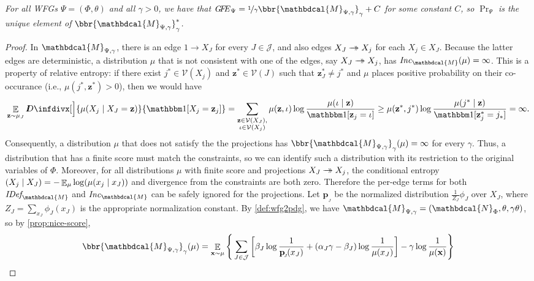 \documentclass[letterpaper]{article} %
\makeatletter
\theoremstyle{plain}
\theoremstyle{definition}
\theoremstyle{remark}
\newcommand{\restate}[2]
	{\medskip\par\noindent{\bf \expandarg\Cref{thmt@@#1}.}%
 	\noindent\begingroup\em #2 \endgroup\par\smallskip}
\let\H\relax
\DeclareMathOperator{\H}{\mathrm{H}} %
\DeclareMathOperator*{\Ex}{\mathbb{E}} %
\newcommand\mat[1]{\mathbf{#1}}
\newcommand{\thickD}{I\mkern-8muD}
\newcommand{\kldiv}{\thickD\infdivx}
\newcommand{\tto}{\rightarrow\mathrel{\mspace{-15mu}}\rightarrow}
\newcommand{\bp}[1][L]{\mat{p}_{\!_{#1}\!}}
\newcommand{\V}{\mathcal V}
\newcommand{\dg}[1]{\mathbdcal{#1}}
\newcommand{\IDef}[1]{\mathit{IDef}_{\!#1}}
\newcommand\Inc{\mathit{Inc}}
\newcommand{\PDGof}[1]{{\dg M}_{#1}}
\newcommand{\UPDGof}[1]{{\dg N}_{#1}}
\newcommand\GFE{\mathit{G\mkern-4mu F\mkern-4.5mu E}}
\makeatother
\begin{document}
\restate{thm:fg-is-pdg}{
	For all WFGs $\Psi = (\Phi,\theta)$ and all $\gamma > 0$,
	we have that
	$\GFE_\Psi
	= \nicefrac1{\gamma} \bbr{{\dg M}_{\Psi,\gamma}}_{\gamma} 
	+ C$   
	for some constant $C$, so
	$\Pr_{\Psi}$ is the unique element of
	$\bbr{{\dg M}_{\Psi,\gamma}}_{\gamma}^*$.
}
\begin{proof}
  In $\PDGof{\Psi,\gamma}$,  there is an edge $1 \to X_J$ for every $J
  \in \mathcal J$, and also edges 
  $X_J \tto X_j$ for each $X_j
    \in X_J$. Because the latter edges are deterministic, a
distribution $\mu$ that is not  consistent
with one of the edges, say $X_J \tto X_j$, has $\Inc_{\dg M}(\mu)
= \infty$.  This is a 
property of relative entropy: if there exist $j^* \in \V(X_j)$ and 
$\mat z^* \in \V(J)$ such that $\mat z^*_J \ne j^*$ and $\mu$ places positive
probability on their co-occurance (i.e., $\mu(j^*, \mat z^*) > 0$),
then we would have
\[ \Ex_{\mat z \sim \mu_{J}}\kldiv[\Big]{\mu(X_j \mid X_J = \mat z)}
	{\mathbbm1[X_j = \mat z_{j}]}
 	= \sum_{\substack{\mat z \in \V(X_J),\\ \iota \in \V(X_j)}} \mu(\mat z, \iota) \log \frac{\mu(\iota \mid \mat z)}{\mathbbm1[\mat z_j = \iota]}
	\geq \mu(\mat z^*, j^*) \log \frac{\mu(j^* \mid \mat z)}{\mathbbm1[\mat z^*_j = j_*]}
	= \infty. \]
Consequently, a distribution $\mu$ that does not satisfy the the projections has
$\bbr{\dg M_{\Psi,\gamma}}_\gamma(\mu) = \infty$ for every $\gamma$.
          Thus, a distribution that 
        has a finite score must match the constraints,
so we can identify such a distribution with its restriction to 
the original  
variables of $\Phi$.
Moreover, for all distributions $\mu$ with finite score and
projections $X_J \tto 
X_j$, the conditional entropy 
$\H(X_j \mid X_J) = -\Ex_\mu\log(\mu(x_j \mid x_J))$ and divergence from
the constraints are both zero. 
Therefore the per-edge terms for both $\IDef{\dg M}$
and $\Inc_{\dg M}$ can be safely ignored for the projections.
Let $\bp[J]$ be
the normalized distribution $\frac{1}{Z_J}\phi_J$ over $X_J$,
where $Z_J = \sum_{x_J} \phi_J(x_J)$ is the appropriate normalization constant.
By
\cref{def:wfg2pdg}, we have $\PDGof{\Psi,\gamma} = (\UPDGof{\Phi}, \theta, \gamma\theta)$,
so by \cref{prop:nice-score},
	\begin{align*}
\bbr{\PDGof{\Psi,\gamma}}_\gamma(\mu) 
	&= \Ex_{\mat x \sim \mu} \Bigg\{   \sum_{ J \in \mathcal J } \left[
		\beta_J \log \frac{1}{ \bp[J](x_J) } + 
			(\alpha_J \gamma -\beta_J)
		 \log \frac{1}{\mu(x_J)} \right] - \gamma \log \frac{1}{\mu(\mat x)} \Bigg\} \\

\end{align*}
\end{proof}
\end{document}

